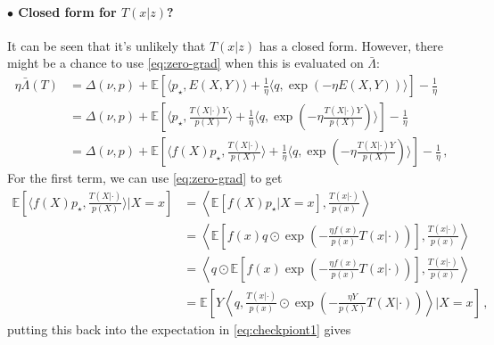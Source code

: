\documentclass{article}
\theoremstyle{plain}
\theoremstyle{definition}
\theoremstyle{remark}
\newcommand{\E}{\mathbb E}
\theoremstyle{definition}
\begin{document}
\paragraph{$\bullet$ Closed form for $T(x|z)$?}
It can be seen that it's unlikely that $T(x|z)$ has a closed form.
However, there might be a chance to use \cref{eq:zero-grad} when this is evaluated on $\bar{\Lambda}$:
\begin{align}
    \eta\bar{\Lambda}(T)
     & =
    \Delta(\nu, p) +
    \E\!\left[
        \langle p_\star, E(X, Y) \rangle
        + \frac{1}{\eta}
        \langle q, \exp(- \eta E(X, Y))\rangle
        \right]
    - \frac{1}{\eta}
    \nonumber
    \\
     & =
    \Delta(\nu, p) +
    \E\!\left[
        \langle p_\star, \tfrac{T(X|\cdot) Y}{p(X)} \rangle
        + \frac{1}{\eta}
        \langle q, \exp(- \eta \tfrac{T(X|\cdot) Y}{p(X)})\rangle
        \right]
    - \frac{1}{\eta}
    \nonumber
    \\
     & =
    \Delta(\nu, p) +
    \E\!\left[
        \langle f(X) p_\star, \tfrac{T(X|\cdot)}{p(X)} \rangle
        + \frac{1}{\eta}
        \langle q, \exp(- \eta \tfrac{T(X|\cdot) Y}{p(X)})\rangle
        \right]
    - \frac{1}{\eta}\,,
    \label{eq:checkpiont1}
\end{align}
For the first term, we can use \cref{eq:zero-grad} to get
\begin{align*}
    \E\!\left[
        \langle f(X) p_\star, \tfrac{T(X|\cdot)}{p(X)} \rangle
        | X =x
        \right]
     & =
    \left\langle
    \E\!\left[
        f(X) p_\star
        | X =x
        \right]
    , \tfrac{T(x|\cdot)}{p(x)}
    \right\rangle
    \\
     & =
    \left\langle
    \E\!\left[
        f(x) q \odot \exp(- \tfrac{\eta f(x)}{p(x)} T(x|\cdot))
        \right]
    , \tfrac{T(x|\cdot)}{p(x)}
    \right\rangle
    \\
     & =
    \left\langle
    q \odot
    \E\!\left[
        f(x)
        \exp(- \tfrac{\eta f(x)}{p(x)} T(x|\cdot))
        \right]
    , \tfrac{T(x|\cdot)}{p(x)}
    \right\rangle
    \\
     & =
    \E\!\left[
        Y
        \left\langle
        q
        , \tfrac{T(x|\cdot)}{p(x)}
        \odot
        \exp(- \tfrac{\eta Y}{p(X)} T(X|\cdot))
        \right\rangle
        | X = x
        \right]\,,
\end{align*}
putting this back into the expectation in \cref{eq:checkpiont1} gives
\end{document}
